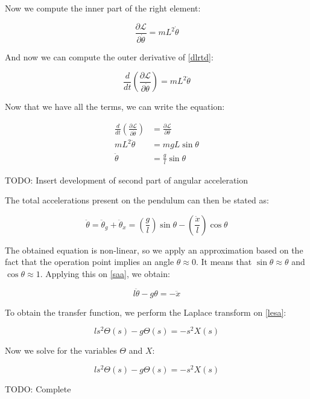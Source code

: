Now we compute the inner part of the right element:

\begin{equation} \label{dlrtd}
	\frac{\partial\mathcal{L}}{\partial\dot{\theta}}=mL^2\dot{\theta}
\end{equation}

And now we can compute the outer derivative of \ref{dlrtd}:

\begin{equation} \label{dlrtt}
	\frac{d}{dt}\left( \frac{\partial\mathcal{L}}{\partial\dot{\theta}} \right)=mL^2\ddot{\theta}
\end{equation}

Now that we have all the terms, we can write the equation:

\begin{equation} \label{eles}
	\begin{split}
		\frac{d}{dt}\left( \frac{\partial\mathcal{L}}{\partial\dot{\theta}} \right)&=\frac{\partial\mathcal{L}}{\partial\theta}\\
		mL^2\ddot{\theta}&=mgL\sin{\theta}\\
		\ddot{\theta}&=\frac{g}{l}\sin{\theta}
	\end{split}
\end{equation}

TODO: Insert development of second part of angular acceleration

The total accelerations present on the pendulum can then be stated as:

\begin{equation} \label{saa}
	\ddot{\theta}=\ddot{\theta}_g+\ddot{\theta}_x=\left(\frac{g}{l}\right)\sin{\theta}-\left(\frac{\dot{x}}{l}\right)\cos{\theta}
\end{equation}

The obtained equation is non-linear, so we apply an approximation based on the fact that the operation point implies an angle $\theta\approx0$. It means that $\sin{\theta}\approx\theta$ and $\cos{\theta}\approx1$. Applying this on \ref{saa}, we obtain:

\begin{equation} \label{lesa}
	l\ddot{\theta}-g\theta=-\ddot{x}
\end{equation}

To obtain the transfer function, we perform the Laplace transform on \ref{lesa}:

\begin{equation} \label{ltsa}
	ls^2\Theta(s)-g\Theta(s)=-s^2X(s)
\end{equation}

Now we solve for the variables $\Theta$ and $X$:

\begin{equation} \label{tfsa}
	ls^2\Theta(s)-g\Theta(s)=-s^2X(s)
\end{equation}

TODO: Complete
